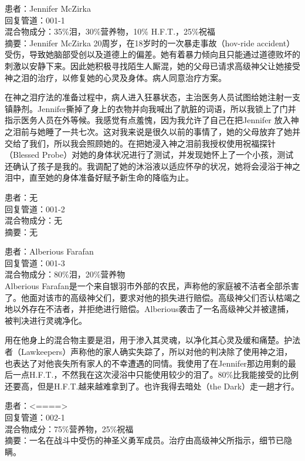 \begin{scpbox}

患者：Jennifer McZirka\\
回复管道：001-1\\
混合物成分：35\%泪，30\%营养物，10\% H.F.T.，25\%祝福\\
摘要：Jennifer McZirka 20周岁，在18岁时的一次暴走事故（hov-ride accident）受伤，导致她脑部受创以及道德上的偏差。她有着暴力倾向且只能通过道德败坏的刺激以安静下来。因此她积极寻找陌生人厮混，她的父母已请求高级神父让她接受神之泪的治疗，以修复她的心灵及身体。病人同意治疗方案。

在神之泪疗法的准备过程中，病人进入狂暴状态，主治医务人员试图给她注射一支镇静剂。Jennifer撕掉了身上的衣物并向我喊出了肮脏的词语，所以我锁上了门并指示医务人员在外等候。我感觉有点羞愧，因为我允许了自己在把Jennifer 放入神之泪前与她睡了一共七次。这对我来说是很久以前的事情了，她的父母放弃了她并交给了我们，所以我会照顾她的。在把她浸入神之泪前我授权使用祝福探针（Blessed Probe）对她的身体状况进行了测试，并发现她怀上了一个小孩，测试还确认了孩子是我的。我调配了她的沐浴液以适应怀孕的状况，她将会浸浴于神之泪中，直至她的身体准备好赋予新生命的降临为止。

\hr

患者：无\\
回复管道：001-2\\
混合物成分：无\\
摘要：无

\hr

患者：Alberious Farafan\\
回复管道：001-3\\
混合物成分：80\%泪，20\%营养物\\
Alberious Farafan是一个来自银羽市外部的农民，声称他的家庭被不洁者全部杀害了。他面对该市的高级神父们，要求对他的损失进行赔偿。高级神父们否认枯竭之地以外存在不洁者，并拒绝进行赔偿。Alberious袭击了一名高级神父并被逮捕，被判决进行灵魂净化。

用在他身上的混合物主要是泪，用于渗入其灵魂，以净化其心灵及缓和痛楚。护法者（Lawkeepers）声称他的家人确实失踪了，所以对他的判决除了使用神之泪，也表达了对他丧失所有家人的不幸遭遇的同情。我使用了在Jennifer那边用剩的最后一点H.F.T.，不然我在这次浸浴中只能使用较少的泪了。80\%比我能接受的比例还要高，但是H.F.T.越来越难拿到了。也许我得去暗处（the Dark）走一趟才行。

\hr

患者：<====>\\
回复管道：002-1\\
混合物成分：75\%营养物，25\%祝福\\
摘要：一名在战斗中受伤的神圣义勇军成员。治疗由高级神父所指示，细节已隐瞒。


\end{scpbox}
